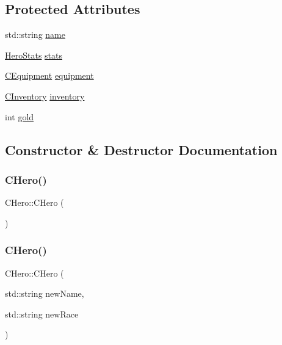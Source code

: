 \subsection*{Protected Attributes}
\begin{DoxyCompactItemize}
\item 
std\+::string \mbox{\hyperlink{class_c_hero_aef47575d9fb80e636bc99f7402a09169}{name}}
\item 
\mbox{\hyperlink{struct_hero_stats}{Hero\+Stats}} \mbox{\hyperlink{class_c_hero_ad0f762c5159f5ad1eebec205a700496a}{stats}}
\item 
\mbox{\hyperlink{class_c_equipment}{C\+Equipment}} \mbox{\hyperlink{class_c_hero_a1d57f797a22e8c02b2e7c3909a75b456}{equipment}}
\item 
\mbox{\hyperlink{class_c_inventory}{C\+Inventory}} \mbox{\hyperlink{class_c_hero_a711765d0b222d1e8126a0a5199042f5c}{inventory}}
\item 
int \mbox{\hyperlink{class_c_hero_acc4cc7eb88f2d67a5920ebabeca7cc46}{gold}}
\end{DoxyCompactItemize}


\subsection{Constructor \& Destructor Documentation}
\mbox{\label{class_c_hero_a1d6f7e413063f4a842ed00ba0c90ee72}} 
\subsubsection{\texorpdfstring{C\+Hero()}{CHero()}\hspace{0.1cm}{\footnotesize\ttfamily [1/2]}}
{\footnotesize\ttfamily C\+Hero\+::\+C\+Hero (\begin{DoxyParamCaption}{ }\end{DoxyParamCaption})\hspace{0.3cm}{\ttfamily [default]}}

\mbox{\label{class_c_hero_aca0736bba589d24026c4947b047ec7ca}} 
\subsubsection{\texorpdfstring{C\+Hero()}{CHero()}\hspace{0.1cm}{\footnotesize\ttfamily [2/2]}}
{\footnotesize\ttfamily C\+Hero\+::\+C\+Hero (\begin{DoxyParamCaption}\item[{std\+::string}]{new\+Name,  }\item[{std\+::string}]{new\+Race }\end{DoxyParamCaption})}



